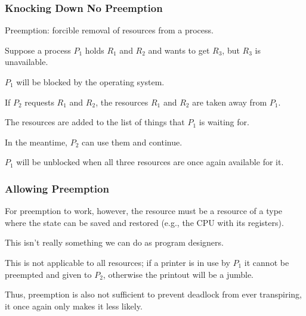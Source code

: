 \begin{frame}
	\frametitle{Knocking Down No Preemption}

	Preemption: forcible removal of resources from a process.

	Suppose a process $P_{1}$ holds $R_{1}$ and $R_{2}$ and wants to get $R_{3}$, but $R_{3}$ is unavailable.

	$P_{1}$ will be blocked by the operating system.

	If $P_{2}$ requests $R_{1}$ and $R_{2}$, the resources $R_{1}$ and $R_{2}$ are taken away from $P_{1}$.

	The resources are added to the list of things that $P_{1}$ is waiting for.

	In the meantime, $P_{2}$ can use them and continue.

	$P_{1}$ will be unblocked when all three resources are once again available for it.

\end{frame}


\begin{frame}
	\frametitle{Allowing Preemption}

	For preemption to work, however, the resource must be a resource of a type where the state can be saved and restored (e.g., the CPU with its registers).

	This isn't really something we can do as program designers.

	This is not applicable to all resources; if a printer is in use by $P_{1}$ it cannot be preempted and given to $P_{2}$, otherwise the printout will be a jumble.

	Thus, preemption is also not sufficient to prevent deadlock from ever transpiring, it once again only makes it less likely.



\end{frame}




